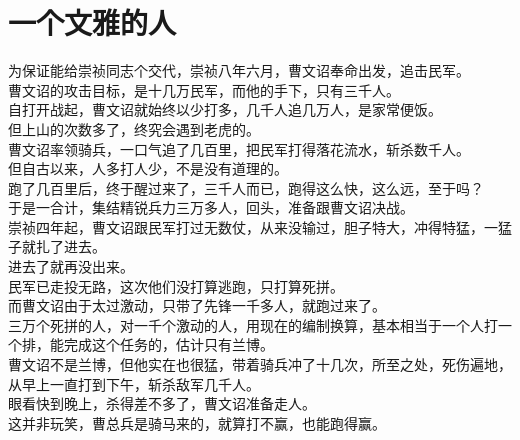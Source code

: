 \section{一个文雅的人}
\ifnum{}
	\begin{multicols}{\theparacolNo}
\fi
为保证能给崇祯同志个交代，崇祯八年六月，曹文诏奉命出发，追击民军。\\

曹文诏的攻击目标，是十几万民军，而他的手下，只有三千人。\\

自打开战起，曹文诏就始终以少打多，几千人追几万人，是家常便饭。\\

但上山的次数多了，终究会遇到老虎的。\\

曹文诏率领骑兵，一口气追了几百里，把民军打得落花流水，斩杀数千人。\\

但自古以来，人多打人少，不是没有道理的。\\

跑了几百里后，终于醒过来了，三千人而已，跑得这么快，这么远，至于吗？\\

于是一合计，集结精锐兵力三万多人，回头，准备跟曹文诏决战。\\

崇祯四年起，曹文诏跟民军打过无数仗，从来没输过，胆子特大，冲得特猛，一猛子就扎了进去。\\

进去了就再没出来。\\

民军已走投无路，这次他们没打算逃跑，只打算死拼。\\

而曹文诏由于太过激动，只带了先锋一千多人，就跑过来了。\\

三万个死拼的人，对一千个激动的人，用现在的编制换算，基本相当于一个人打一个排，能完成这个任务的，估计只有兰博。\\

曹文诏不是兰博，但他实在也很猛，带着骑兵冲了十几次，所至之处，死伤遍地，从早上一直打到下午，斩杀敌军几千人。\\

眼看快到晚上，杀得差不多了，曹文诏准备走人。\\

这并非玩笑，曹总兵是骑马来的，就算打不赢，也能跑得赢。\\


\end{multicols}
